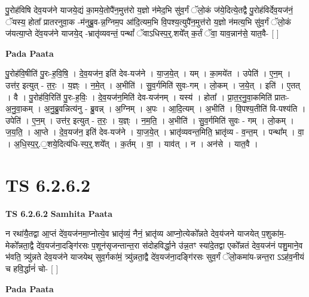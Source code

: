 \documentclass[17pt]{extarticle}
\begin{document}
पु॒रोह॑विषि देव॒यज॑ने याजये॒द्यं का॒मये॒तोपै॑न॒मुत्त॑रो य॒ज्ञो न॑मेद॒भि सु॑व॒र्गं ॅलो॒कं ज॑ये॒दित्ये॒तद्वै पु॒रोह॑विर्देव॒यज॑नं॒ ॅयस्य॒ होता᳚ प्रातरनुवा॒क -म॑नुब्रु॒व-न्न॒ग्निम॒प आ॑दि॒त्यम॒भि वि॒पश्य॒त्युपै॑न॒मुत्त॑रो य॒ज्ञो न॑मत्य॒भि सु॑व॒र्गं ॅलो॒कं ज॑यत्या॒प्ते दे॑व॒यज॑ने याजये॒द् -भ्रातृ॑व्यवन्तं॒ पन्थां᳚ ॅवाऽधिस्प॒र्॒.शये᳚त् क॒र्तं ॅवा॒ याव॒न्नान॑से॒ यात॒वै- [  ] \newline

\textbf{Pada Paata} \newline

पु॒रोह॑वि॒षीति॑ पु॒रः-ह॒वि॒षि॒ । दे॒व॒यज॑न॒ इति॑ देव-यज॑ने । या॒ज॒ये॒त् । यम् । का॒मये॑त । उपेति॑ । ए॒न॒म् । उत्त॑र॒ इत्युत् - त॒रः॒ । य॒ज्ञ्ः । न॒मे॒त् । अ॒भीति॑ । सु॒व॒र्गमिति॑ सुवः-गम् । लो॒कम् । ज॒ये॒त् । इति॑ । ए॒तत् । वै । पु॒रोह॑वि॒रिति॑ पु॒रः-ह॒विः॒ । दे॒व॒यज॑न॒मिति॑ देव-यज॑नम् । यस्य॑ । होता᳚ । प्रा॒त॒र॒नु॒वा॒कमिति॑ प्रातः-अ॒नु॒वा॒कम् । अ॒नु॒ब्रु॒वन्नित्य॑नु - ब्रु॒वन्न् । अ॒ग्निम् । अ॒पः । आ॒दि॒त्यम् । अ॒भीति॑ । वि॒पश्य॒तीति॑ वि-पश्य॑ति । उपेति॑ । ए॒न॒म् । उत्त॑र॒ इत्युत् - त॒रः॒ । य॒ज्ञ्ः । न॒म॒ति॒ । अ॒भीति॑ । सु॒व॒र्गमिति॑ सुवः - गम् । लो॒कम् । ज॒य॒ति॒ । आ॒प्ते । दे॒व॒यज॑न॒ इति॑ देव-यज॑ने । या॒ज॒ये॒त् । भ्रातृ॑व्यवन्त॒मिति॒ भ्रातृ॑व्य - व॒न्त॒म् । पन्था᳚म् । वा॒ । अ॒धि॒स्प॒र्॒.॒शये॒दित्य॑धि-स्प॒र्॒.शये᳚त् । क॒र्तम् । वा॒ । याव॑त् । न । अन॑से । यात॒वै ।  \newline




\section*{ TS 6.2.6.2 }

\textbf{TS 6.2.6.2 } \newline
\textbf{Samhita Paata} \newline

न रथा॑यै॒तद्वा आ॒प्तं दे॑व॒यज॑नमा॒प्नोत्ये॒व भ्रातृ॑व्यं॒ नैनं॒ भ्रातृ॑व्य आप्नो॒त्येको᳚न्नते देव॒य॑जने याजयेत् प॒शुका॑म॒-मेको᳚न्नता॒द्वै दे॑व॒यज॑ना॒दङ्गि॑रसः प॒शून॑सृजन्तान्त॒रा स॑दोहविर्द्धा॒ने उ॑न्न॒तꣳ स्या॑दे॒तद्वा एको᳚न्नतं देव॒यज॑नं पशु॒माने॒व भ॑वति॒ त्र्यु॑न्नते देव॒यज॑ने याजयेथ् सुव॒र्गका॑मं॒ त्र्यु॑न्नता॒द्वै दे॑व॒यज॑ना॒दङ्गि॑रसः सुव॒र्गं ॅलो॒कमा॑य-न्नन्त॒रा ऽऽह॑व॒नीयं च हवि॒र्द्धानं॑ चो- [  ] \newline

\textbf{Pada Paata} \newline
\end{document}
